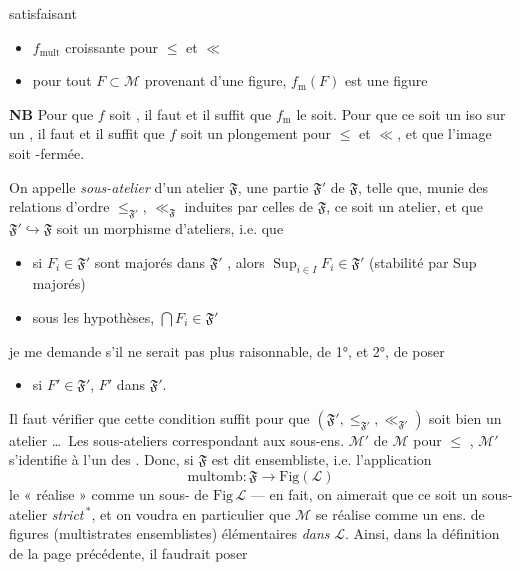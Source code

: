 \documentclass[11pt,a4paper]{article}
\begin{document}

satisfaisant
\begin{itemize}
  \item[a)] $f_{\mathrm{mult}}$ croissante pour $\leq$ et $\ll$
  \item[b)]  pour tout $F \subset \mathcal{M}$ provenant d'une figure, $f_{\mathrm{m}}(F)$ est une figure
\end{itemize}

\textbf{NB} Pour que $f$ soit \ill{}, il faut et il suffit que $f_{\mathrm{m}}$ le soit. Pour que ce soit un iso sur un \ill{} \ill{}, il faut et il suffit que $f$ soit un plongement pour $\leq$ et $\ll$, et que l'image soit \ill{}-fermée.

On appelle \emph{sous-atelier} d'un atelier $\mathfrak{F}$, une  partie $\mathfrak{F}'$ de $\mathfrak{F}$, telle que, munie des relations d'ordre $\leq_{\mathfrak{F}'}$, $\ll_{\mathfrak{F}}$ induites par celles de $\mathfrak{F}$, ce soit un atelier, et que $\mathfrak{F}' \hookrightarrow \mathfrak{F}$ soit un morphisme d'ateliers, i.e. que
\begin{itemize}
  \item[1°)] si $F_i \in \mathfrak{F}'$ sont majorés dans $\mathfrak{F}'$ , alors $\operatorname{Sup}_{i \in I} F_i \in \mathfrak{F}'$ (stabilité par Sup majorés)
  \item[2°)] sous les \struck{\ill{}} hypothèses, $\bigcap F_i \in \mathfrak{F}'$
\end{itemize}
\ill{} je me demande s'il ne serait pas plus raisonnable, \ill{} de 1°, et 2°, de poser \struck{\ill{}}
\begin{itemize}
  \item[(*)] si $F' \in \mathfrak{F}'$,  \ill{} $F'$ \ill{} dans $\mathfrak{F}'$.
\end{itemize}
Il faut vérifier \add{\ill{}} que cette condition suffit pour que $(\mathfrak{F}', \leq_{\mathfrak{F}'}, \ll_{\mathfrak{F}'})$ soit bien un atelier \ldots\ Les sous-ateliers correspondant aux sous-ens. $\mathcal{M}'$ de $\mathcal{M}$  pour $\leq$ \ill{}, \ill{} $\mathcal{M}'$ s'identifie à l'un des \ill{}. Donc, si $\mathfrak{F}$ est dit ensembliste, i.e. l'application
\[
  \mathrm{multomb} : \mathfrak{F} \longrightarrow \mathrm{Fig}(\mathcal{L})
\]
le « réalise » comme un sous-\ill{} de $\mathrm{Fig}\, \mathcal{L}$ --- en fait, on aimerait que ce soit un sous-atelier \emph{strict}\,$^{*}$, et on voudra  en particulier que $\mathcal{M}$ se réalise comme un ens. de figures (multistrates ensemblistes) élémentaires \emph{dans} $\mathcal{L}$. Ainsi, dans la définition de la page précédente, il faudrait \ill{} poser
\end{document}
